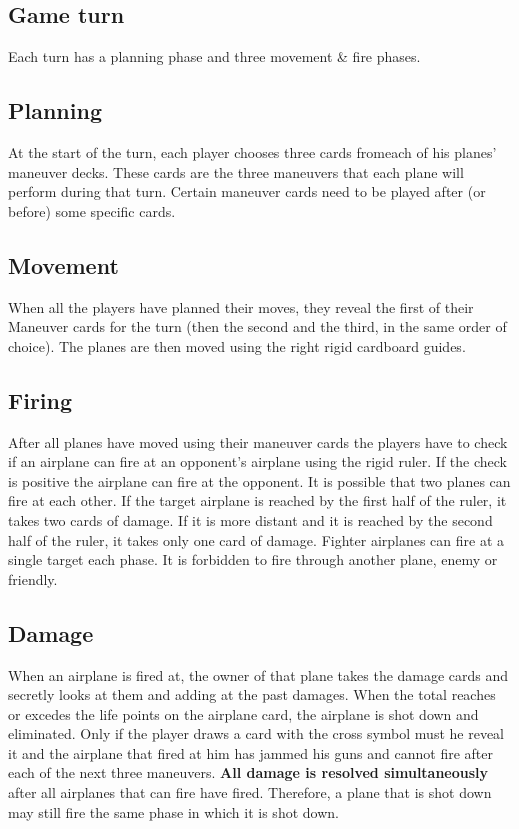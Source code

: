 \documentclass[12pt]{report}
\begin{document}
\subsection{Game turn}
Each turn has a planning phase and three movement \& fire phases.
\subsection{Planning}
 At the start of the turn, each player chooses three cards fromeach of his planes’ maneuver decks. These cards are the three maneuvers that each plane will perform during that turn.
Certain maneuver cards need to be played after (or before) some specific cards.
\subsection{Movement}
When all the players have planned their moves, they reveal the first of their Maneuver cards for the turn (then the second and the third, in the same order of choice).
The planes are then moved using the right rigid cardboard guides.
\subsection{Firing}
After all planes have moved using their maneuver cards the players have to check if an airplane can fire at an opponent’s airplane using the rigid ruler. If the check is positive the airplane can fire at the opponent. It is possible that two planes can fire at each other. 
If the target airplane is reached by the first half of the ruler, it takes two cards of damage. If it is more distant and it is reached by the second half of the ruler, it takes only one card of damage. Fighter airplanes can fire at a single target each phase. It is forbidden to fire through another plane, enemy or friendly.
\subsection{Damage}
When an airplane is fired at, the owner of that plane takes the damage cards and secretly looks at them and adding at the past damages. When the total reaches or excedes the life points on the airplane card, the airplane is shot down and eliminated.
Only if the player draws a card with the cross symbol must he reveal it and the airplane that fired at him has jammed his guns and cannot fire after each of the next three maneuvers.
\textbf{All damage is resolved simultaneously} after all airplanes that can fire have fired. Therefore, a plane that is shot down may still fire the same phase in which it is shot down.
\end{document}

